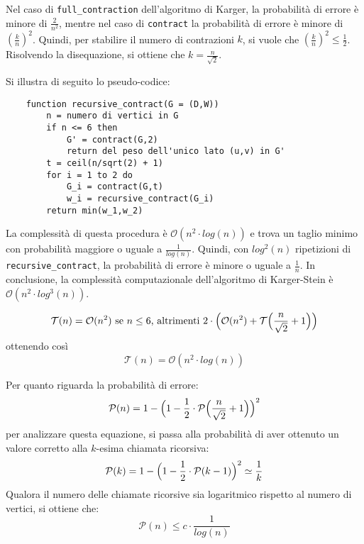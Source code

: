 Nel caso di \verb|full_contraction| dell'algoritmo di Karger, la probabilità di errore 
è minore di $\frac{2}{n^2}$, mentre nel caso di \verb|contract| la probabilità di 
errore è minore di $(\frac{k}{n})^2$. Quindi, per stabilire il numero di contrazioni 
$k$, si vuole che $(\frac{k}{n})^2 \le \frac{1}{2}$. Risolvendo la disequazione, si 
ottiene che $k = \frac{n}{\sqrt2}$.

Si illustra di seguito lo pseudo-codice:
\begin{verbatim}
    function recursive_contract(G = (D,W))
        n = numero di vertici in G 
        if n <= 6 then
            G' = contract(G,2)
            return del peso dell'unico lato (u,v) in G'
        t = ceil(n/sqrt(2) + 1)
        for i = 1 to 2 do
            G_i = contract(G,t)
            w_i = recursive_contract(G_i)
        return min(w_1,w_2)
\end{verbatim}
La complessità di questa procedura è $\mathcal{O}(n^2 \cdot log(n))$ e trova un 
taglio minimo con probabilità maggiore o uguale a $\frac{1}{log(n)}$. Quindi, con $log^2(n)$ 
ripetizioni di \verb|recursive_contract|, la probabilità di errore è minore o uguale 
a $\frac{1}{n}$. In conclusione, la complessità computazionale dell'algoritmo di 
Karger-Stein è $\mathcal{O}(n^2 \cdot log^3(n))$.

\[
    \mathcal{T}(n) = \mathcal{O}(n^2) \textnormal{ se } n \le 6 \textnormal{, altrimenti } 2 \cdot \Bigl(\mathcal{O}(n^2) + \mathcal{T}\Bigl(\frac{n}{\sqrt2} + 1\Bigr)\Bigr)  
\]
ottenendo così
\[
    \mathcal{T}(n) = \mathcal{O}(n^2 \cdot log(n))  
\]

Per quanto riguarda la probabilità di errore:
\[
    \mathcal{P}(n) = 1 - \Bigl(1 - \frac{1}{2} \cdot \mathcal{P}\Bigl(\frac{n}{\sqrt2} + 1\Bigr)\Bigr)^2
\]
per analizzare questa equazione, si passa alla probabilità di aver ottenuto un valore 
corretto alla $k$-esima chiamata ricorsiva:
\[
    \mathcal{P}(k) = 1 - \Bigl(1 - \frac{1}{2} \cdot \mathcal{P}(k - 1)\Bigr)^2 \simeq \frac{1}{k}
\]
Qualora il numero delle chiamate ricorsive sia logaritmico rispetto al numero di vertici, 
si ottiene che:
\[
    \mathcal{P}(n) \le c \cdot \frac{1}{log(n)}
\]

